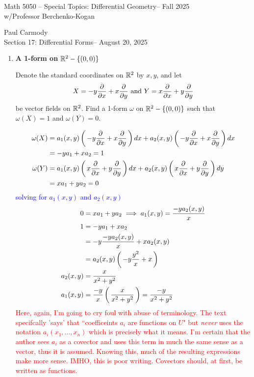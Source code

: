 \documentclass[12pt,a4paper]{report}
\newcommand{\CLASSNAME}{Math 5050 -- Special Topics: Differential Geometry}
\newcommand{\STUDENTNAME}{Paul Carmody}
\newcommand{\ASSIGNMENT}{Section 17: Differential Forms}
\newcommand{\DUEDATE}{August 20, 2025}
\newcommand{\PROFESSOR}{Professor Berchenko-Kogan}
\newcommand{\SEMESTER}{Fall 2025}
\newcommand{\RED}[1]{\textcolor{red}{#1}}
\newcommand{\BLUE}[1]{\textcolor{blue}{#1}}
\begin{document}
\begin{center}
	\Large{\CLASSNAME -- \SEMESTER} \\
	\large{ w/\PROFESSOR}
\end{center}
\begin{center}
	\STUDENTNAME \\
	\ASSIGNMENT -- \DUEDATE\\
\end{center} 

\begin{enumerate}[label=\textbf{17.\arabic*.}]

\item \textbf{A 1-form on $\mathbb{R}^2-\{(0,0)\}$}

Denote the standard coordinates on $\mathbb{R}^2$ by $x,y$, and let
\begin{align*}
	X = -y\frac{\partial }{\partial x}+x\frac{\partial }{\partial y} \text{ and } Y=x\frac{\partial }{\partial x}+y\frac{\partial }{\partial y}
\end{align*}be vector fields on $\mathbb{R}^2$.  Find a 1-form $\omega$ on $\mathbb{R}^2-\{(0,0)\}$ such that $\omega(X)=1$ and $\omega(Y)=0$.

\BLUE{\begin{align*}
	\omega(X) &= a_1(x,y)\left (\, -y\frac{\partial }{\partial x}+x\frac{\partial }{\partial y} \,\right )dx + a_2(x,y)\left (\, -y\frac{\partial }{\partial x}+x\frac{\partial }{\partial y} \,\right )dx \\
	&= -ya_1+xa_2 = 1\\
	\omega(Y) &= a_1(x,y)\left (\, x\frac{\partial }{\partial x}+y\frac{\partial }{\partial y} \,\right )dx+a_2(x,y)\left (\, x\frac{\partial }{\partial x}+y\frac{\partial }{\partial y} \,\right )dy \\
	&= xa_1+ya_2 = 0 
\end{align*}solving for $a_1(x,y)$ and $a_2(x,y)$
\begin{align*}
	0 &= xa_1+ya_2 \implies a_1(x,y) = \frac{-ya_2(x,y)}{x} \\
	1 &= -ya_1+xa_2  \\
	&= -y\frac{-ya_2(x,y)}{x}+xa_2(x,y) \\
	&= a_2(x,y)\left (\, -y\frac{y^2}{x}+x \,\right ) \\
	a_2(x,y) &= \frac{x}{x^2+y^2} \\
	a_1(x,y) &= \frac{-y}{x}\left (\, \frac{x}{x^2+y^2} \,\right ) = \frac{-y}{x^2+y^2}
\end{align*}
}\RED{Here, again, I'm going to cry foul with abuse of terminology.  The text specifcally 'says' that ``coefficeints $a_i$ are functions on $U$" but \textit{never} uses the notation $a_i(x_1,\dots, x_n)$ which is precisely what it means.  I'm certain that the author sees $a_i$ as a covector and uses this term in much the same sense as a vector, thus it is assumed.  Knowing this, much of the resulting expressions make more sense.  IMHO, this is poor writing.  Covectors should, at first, be written as functions.
}


\end{enumerate}
\end{document}
